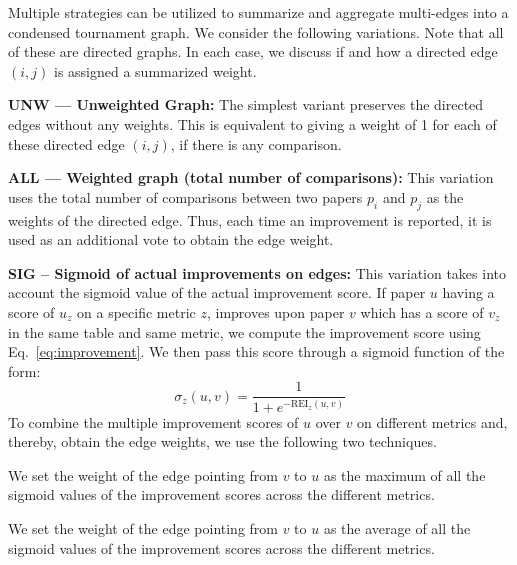 \documentclass[runningheads]{llncs}
\begin{document}
Multiple strategies can be utilized to summarize and aggregate multi-edges into a condensed tournament graph.  We consider the following variations. Note that all of these are directed graphs.  In each case, we discuss if and how a directed edge $(i,j)$ is assigned a summarized weight.

\noindent\textbf{UNW --- Unweighted Graph:}
The simplest variant preserves the directed edges without any weights. This is equivalent to giving a weight of 1 for each of these directed edge $(i,j)$, if there is any comparison.

\noindent\textbf{ALL --- Weighted graph (total number of comparisons):} 
This variation uses the total number of comparisons between two papers $p_i$ and $p_j$ as the weights of the directed edge. Thus, each time an improvement is reported, it is used as an additional vote to obtain the edge weight.

\noindent\textbf{SIG -- Sigmoid of actual improvements on edges:}
This variation takes into account the sigmoid value of the actual improvement score. If paper $u$ having a score of $u_z$ on a specific metric $z$, improves upon paper $v$ which has a score of $v_z$ in the same table and same metric, we compute the improvement score using Eq.~\eqref{eq:improvement}. We then pass this score through a sigmoid function of the form: 
\begin{equation} 
\sigma_z(u,v) = \frac{1}{1+e^{-\textrm{REI}_z(u,v)}}
\end{equation}
To combine the multiple improvement scores of $u$ over $v$ on different metrics and, thereby, obtain the edge weights, we use the following two techniques.
\begin{description}[leftmargin=.5em]
\item[Max:] We set the weight of the edge pointing from $v$ to $u$ as the maximum of all the sigmoid values of the improvement scores across the different metrics. 
\item[Average:] We set the weight of the edge pointing from $v$ to $u$ as the average of all the sigmoid values of the improvement scores across the different metrics.
\end{description}
\end{document}
